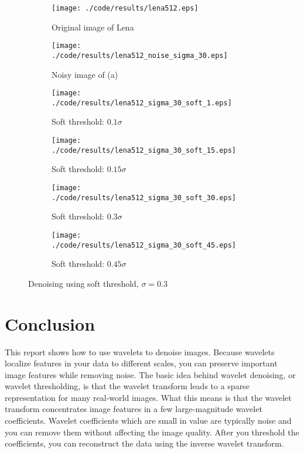 \documentclass[journal,comsoc]{IEEEtran}
\begin{document}
\begin{figure}[!hbt]
  \centering
  \begin{subfigure}{.25\textwidth}
    \centering
    \texttt{[image: ./code/results/lena512.eps]}
    \caption{Original image of Lena}
    \label{subfig:original-image-of-lena}
  \end{subfigure}%
  \begin{subfigure}{.25\textwidth}
    \centering
    \texttt{[image: ./code/results/lena512\_noise\_sigma\_30.eps]}
    \caption{Noisy image of (a)}
    \label{subfig:sigma-10-noisy-image-of-a}
  \end{subfigure}

  \begin{subfigure}{0.25\textwidth}
    \centering{}
    \texttt{[image: ./code/results/lena512\_sigma\_30\_soft\_1.eps]}
    \caption{Soft threshold: $0.1\sigma$}
  \end{subfigure}%
  \begin{subfigure}{.25\textwidth}
    \centering{}
    \texttt{[image: ./code/results/lena512\_sigma\_30\_soft\_15.eps]}
    \caption{Soft threshold: $0.15\sigma$}
  \end{subfigure}

  \begin{subfigure}{0.25\textwidth}
    \centering{}
    \texttt{[image: ./code/results/lena512\_sigma\_30\_soft\_30.eps]}
    \caption{Soft threshold: $0.3\sigma$}
  \end{subfigure}%
  \begin{subfigure}{.25\textwidth}
    \centering{}
    \texttt{[image: ./code/results/lena512\_sigma\_30\_soft\_45.eps]}
    \caption{Soft threshold: $0.45\sigma$}
  \end{subfigure}
  
  \caption{Denoising using soft threshold, $\sigma=0.3$}
  \label{fig:sigma-30-soft-threshold}
\end{figure}


\section{Conclusion}

This report shows how to use wavelets to denoise images. Because wavelets localize
features in your data to different scales, you can preserve important image features
while removing noise. The basic idea behind wavelet denoising, or wavelet thresholding,
is that the wavelet transform leads to a sparse representation for many real-world images.
What this means is that the wavelet transform concentrates image features in a few
large-magnitude wavelet coefficients. Wavelet coefficients which are small in value are
typically noise and you can remove them without affecting the image quality. After you
threshold the coefficients, you can reconstruct the data using the inverse wavelet transform.
\end{document}
